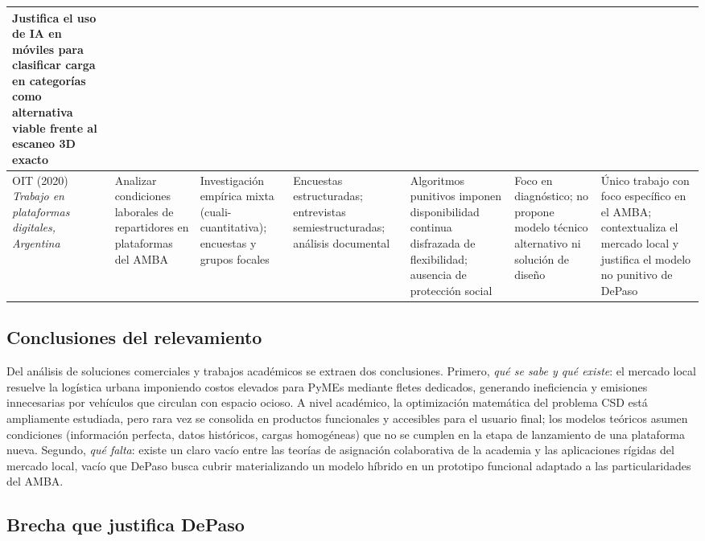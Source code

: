 \begin{table}[H]
{\begin{tabular}{p{2.3cm}p{2.6cm}p{2.3cm}p{2.5cm}p{3.0cm}p{2.5cm}p{3.0cm}}
        Justifica el uso de IA en móviles para clasificar carga en categorías como alternativa viable frente al escaneo 3D exacto \\
        \midrule
        OIT (2020) \newline \emph{Trabajo en plataformas digitales, Argentina} &
        Analizar condiciones laborales de repartidores en plataformas del AMBA &
        Investigación empírica mixta (cuali-cuantitativa); encuestas y grupos focales &
        Encuestas estructuradas; entrevistas semiestructuradas; análisis documental &
        Algoritmos punitivos imponen disponibilidad continua disfrazada de flexibilidad; ausencia de protección social &
        Foco en diagnóstico; no propone modelo técnico alternativo ni solución de diseño &
        Único trabajo con foco específico en el AMBA; contextualiza el mercado local y justifica el modelo no punitivo de DePaso \\
        \bottomrule
    \end{tabular}%
    }%
\end{table}

\subsection{Conclusiones del relevamiento}

Del análisis de soluciones comerciales y trabajos académicos se extraen dos conclusiones. Primero, \emph{qué se sabe y qué existe}: el mercado local resuelve la logística urbana imponiendo costos elevados para PyMEs mediante fletes dedicados, generando ineficiencia y emisiones innecesarias por vehículos que circulan con espacio ocioso. A nivel académico, la optimización matemática del problema CSD está ampliamente estudiada, pero rara vez se consolida en productos funcionales y accesibles para el usuario final; los modelos teóricos asumen condiciones (información perfecta, datos históricos, cargas homogéneas) que no se cumplen en la etapa de lanzamiento de una plataforma nueva. Segundo, \emph{qué falta}: existe un claro vacío entre las teorías de asignación colaborativa de la academia y las aplicaciones rígidas del mercado local, vacío que DePaso busca cubrir materializando un modelo híbrido en un prototipo funcional adaptado a las particularidades del AMBA.

\subsection{Brecha que justifica DePaso}

